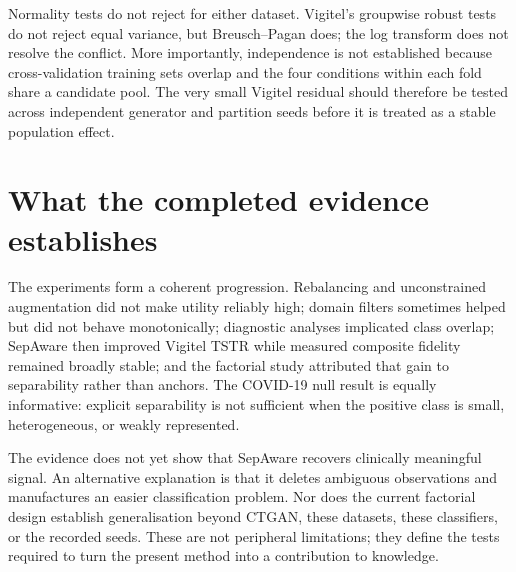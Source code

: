 Normality tests do not reject for either dataset. Vigitel's groupwise robust tests do not reject equal variance, but Breusch--Pagan does; the log transform does not resolve the conflict. More importantly, independence is not established because cross-validation training sets overlap and the four conditions within each fold share a candidate pool. The very small Vigitel residual should therefore be tested across independent generator and partition seeds before it is treated as a stable population effect.

\section{What the completed evidence establishes}

The experiments form a coherent progression. Rebalancing and unconstrained augmentation did not make utility reliably high; domain filters sometimes helped but did not behave monotonically; diagnostic analyses implicated class overlap; SepAware then improved Vigitel TSTR while measured composite fidelity remained broadly stable; and the factorial study attributed that gain to separability rather than anchors. The COVID-19 null result is equally informative: explicit separability is not sufficient when the positive class is small, heterogeneous, or weakly represented.

The evidence does not yet show that SepAware recovers clinically meaningful signal. An alternative explanation is that it deletes ambiguous observations and manufactures an easier classification problem. Nor does the current factorial design establish generalisation beyond CTGAN, these datasets, these classifiers, or the recorded seeds. These are not peripheral limitations; they define the tests required to turn the present method into a contribution to knowledge.
